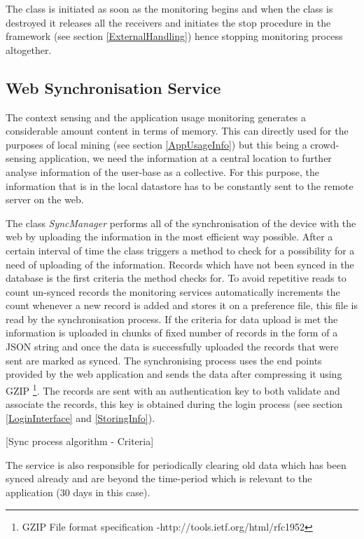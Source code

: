 \documentclass[12pt]{report}
\begin{document}
The class is initiated as soon as the monitoring begins and when the class is destroyed it releases all the receivers and initiates the stop procedure in the framework (see section \ref{ExternalHandling}) hence stopping monitoring process altogether.

\subsection{Web Synchronisation Service}
The context sensing and the application usage monitoring generates a considerable amount content in terms of memory. This can directly used for the purposes of local mining (see section \ref{AppUsageInfo}) but this being a crowd-sensing application, we need the information at a central location to further analyse information of the user-base as a collective. For this purpose, the information that is in the local datastore has to be constantly sent to the remote server on the web.

The class \textit{SyncManager} performs all of the synchronisation of the device with the web by uploading the information in the most efficient way possible. After a certain interval of time the class triggers a method to check for a possibility for a need of uploading of the information. Records which have not been synced in the database is the first criteria the method checks for. To avoid repetitive reads to count un-synced records the monitoring services automatically increments the count whenever a new record is added and stores it on a preference file, this file is read by the synchronisation process. If the criteria for data upload is met the information is uploaded in chunks of fixed number of records in the form of a JSON string and once the data is successfully uploaded the records that were sent are marked as synced. The synchronising process uses the end points provided by the web application and sends the data after compressing it using GZIP \footnote{GZIP File format specification -http://tools.ietf.org/html/rfc1952}. The records are sent with an authentication key to both validate and associate the records, this key is obtained during the login process (see section \ref{LoginInterface} and \ref{StoringInfo}).

[Sync process algorithm - Criteria]

The service is also responsible for periodically clearing old data which has been synced already and are beyond the time-period which is relevant to the application (30 days in this case).
\end{document}
